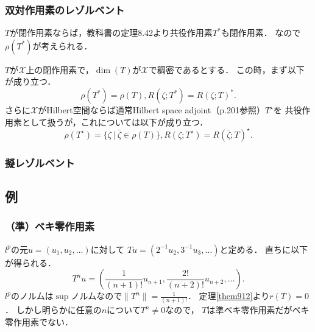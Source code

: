 \documentclass[a4j]{jsarticle}
\newcommand{\spX}{\mathscr{X}}
\begin{document}
    \subsubsection{双対作用素のレゾルベント}
    $T$が閉作用素ならば，教科書の定理8.42より共役作用素$T^*$も閉作用素．
    なので$\rho(T^*)$が考えられる．
    \begin{Thm}[定理9.9, p.213] \label{them909}
        $T$が$\spX$上の閉作用素で，$\dim(T)$が$\spX$で稠密であるとする．
        この時，まず以下が成り立つ．
        \[ \rho(T^*)=\rho(T), R(\zeta;T^*)=R(\zeta;T)^*. \]
        さらに$\spX$がHilbert空間ならば通常Hilbert space adjoint（p.201参照）$T^{\star}$を
        共役作用素として扱うが，これについては以下が成り立つ．
        \[ \rho(T^{\star})=\{ \zeta ~|~ \bar{\zeta} \in \rho(T)\}, R(\zeta;T^{\star})=R(\bar{\zeta};T)^{\star}. \]
    \end{Thm}

    \subsubsection{擬レゾルベント}

    \subsection{例}
        \subsubsection{（準）ベキ零作用素}
        \begin{Example}[例9.14, p.216]
            $l^p$の元$u=(u_1,u_2,\dots)$に対して
            $Tu=(2^{-1}u_2, 3^{-1}u_3, \dots)$と定める．
            直ちに以下が得られる．
            \[ T^n u=\left( \frac{1}{(n+1)!} u_{n+1}, \frac{2!}{(n+2)!} u_{n+2}, \dots \right). \]
            $l^p$のノルムは$\sup$ノルムなので$\|T^n\|=\frac{1}{(n+1)!}$．
            定理\ref{them912}より$r(T)=0$．
            しかし明らかに任意の$n$について$T^n \neq 0$なので，
            $T$は準ベキ零作用素だがベキ零作用素でない．
        \end{Example}
\end{document}
